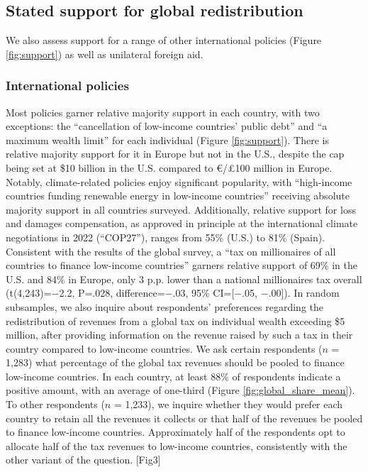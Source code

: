 \documentclass[12pt,english]{article}
\begin{document}
\subsection{Stated support for global redistribution}\label{subsec:support_other}
We also assess support for a range of other international policies (Figure \ref{fig:support}) as well as unilateral foreign aid. %
\subsubsection{International policies}\label{subsubsec:support_other_global_policies} %

Most policies garner relative majority support in each country, with two exceptions: the ``cancellation of low-income countries' public debt'' and ``a maximum wealth limit'' for each individual (Figure \ref{fig:support}). %
There is relative majority support for it in Europe but not in the U.S., despite the cap being set at \$10 billion in the U.S. compared to \euro{}/£100 million in Europe. Notably, climate-related policies enjoy significant popularity, with ``high-income countries funding renewable energy in low-income countries'' receiving absolute majority support in all countries surveyed. Additionally, relative support for loss and damages compensation, as approved in principle at the international climate negotiations in 2022 (``COP27''), ranges from 55\% (U.S.) to 81\% (Spain). %
Consistent with the results of the global survey, 
a ``tax on millionaires of all countries to finance low-income countries'' garners relative support of 69\% in the U.S. and 84\% in Europe, only 3 p.p. lower than a national millionaires tax overall (t(4,243)=$-$2.2, P=.028, difference=$-$.03, 95\% CI=[$-$.05, $-$.00]). In random subsamples, we also inquire about respondents' preferences regarding the redistribution of revenues from a global tax on individual wealth exceeding \$5 million, after providing information on the revenue raised by such a tax in their country compared to low-income countries. 
We ask certain respondents ($n$ = 1,283) what percentage of the global tax revenues should be pooled to finance low-income countries. In each country, at least 88\% of respondents indicate a positive amount, with an average of one-third %
(Figure \ref{fig:global_share_mean}). To other respondents ($n$ = 1,233), we inquire whether they would prefer each country to retain all the revenues it collects or that half of the revenues be pooled to finance low-income countries. Approximately half of the respondents opt to allocate half of the tax revenues to low-income countries, consistently with the other variant of the question.
[Fig3] \label{fig:support}
\end{document}
